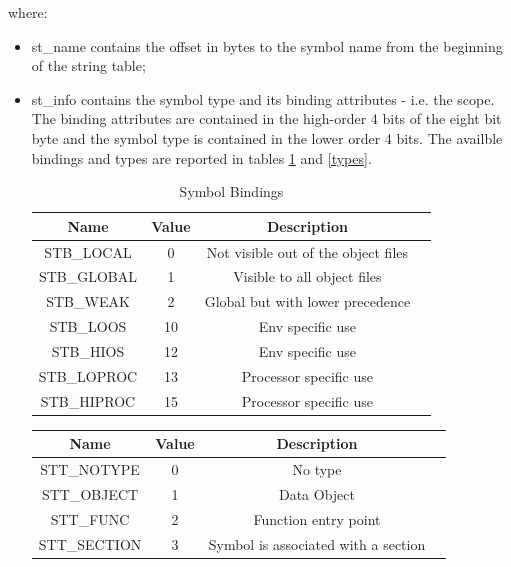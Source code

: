 \documentclass[paper=a4, fontsize=11pt]{report} %
\numberwithin{equation}{section} %
\numberwithin{figure}{section} %
\numberwithin{table}{section} %
\begin{document}
where:
\begin{itemize}
	\item {\ttfamily st\_name} contains the offset in bytes to the symbol name 
	from the beginning of the string table;
	\item {\ttfamily st\_info} contains the symbol type and its binding 
	attributes - i.e. the scope. The binding attributes are contained in the 
	high-order 4 bits of the eight bit byte and the symbol type is contained in 
	the lower order 4 bits. The availble bindings and types are reported in 
	tables \ref{bindings} and \ref{types}.
	\begin{table}[!htbp]
		\begin{center}
			\begin{tabular}{|c|c|c|c|}
				\hline
				\textbf{Name} & \textbf{Value} & \textbf{Description}\\ 
				\hline
				{\ttfamily STB\_LOCAL} & 0 & Not visible out of the object 
				files\\ \hline
				{\ttfamily STB\_GLOBAL} & 1 & Visible to all object files\\ 
				\hline
				{\ttfamily STB\_WEAK} & 2 & Global but with lower precedence\\ 
				\hline
				{\ttfamily STB\_LOOS} & 10 & Env specific use\\ \hline
				{\ttfamily STB\_HIOS} & 12 & Env specific use\\ \hline
				{\ttfamily STB\_LOPROC} & 13 & Processor specific use\\ \hline
				{\ttfamily STB\_HIPROC} & 15 & Processor specific use\\ \hline
			\end{tabular}
			\caption{Symbol Bindings}
			\label{bindings}
		\end{center}
	\end{table}
	\begin{table}[!htbp]
		\begin{center}
			\begin{tabular}{|c|c|c|c|}
				\hline
				\textbf{Name} & \textbf{Value} & \textbf{Description}\\ 
				\hline
				{\ttfamily STT\_NOTYPE} & 0 & No type\\ \hline
				{\ttfamily STT\_OBJECT} & 1 & Data Object\\ \hline
				{\ttfamily STT\_FUNC} & 2 & Function entry point\\ \hline
				{\ttfamily STT\_SECTION} & 3 & Symbol is associated with a 
				section\\ \hline

\end{tabular}
\end{center}
\end{table}
\end{itemize}
\end{document}

